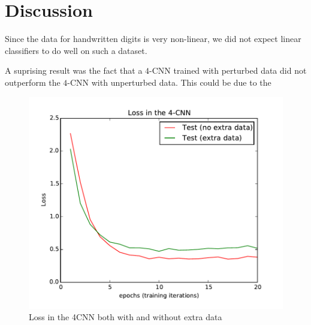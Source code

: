 \documentclass[conference]{IEEEtran}
\begin{document}
\section{Discussion}

Since the data for handwritten digits is very non-linear, we did not expect linear classifiers to do well on such a dataset.

A suprising result was the fact that a $4$-CNN trained with perturbed data did not outperform the $4$-CNN with unperturbed data. This could be due to the 
\begin{figure}[h]
	\centering
	\includegraphics[scale=0.6]{4CNN_and_extraloss.pdf}
	\caption{Loss in the 4CNN both with and without extra data}
	\label{both_C4NNacc}
\end{figure}
\end{document}
